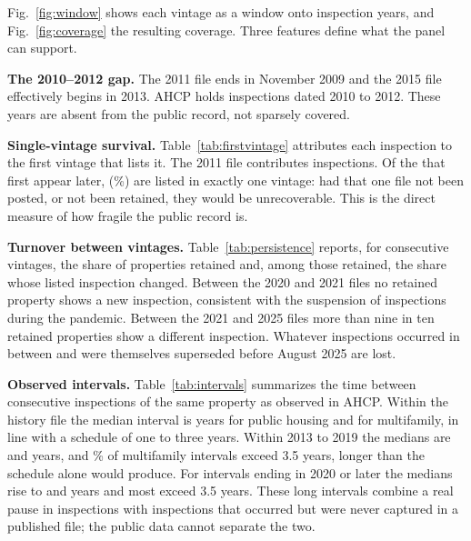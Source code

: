 \documentclass[10pt,twocolumn,letterpaper]{article}
\newcommand{\runhead}[1]{\par\vspace{0.35ex}\noindent\textbf{#1}\hspace{0.35em}}
\begin{document}
Fig.~\ref{fig:window} shows each vintage as a window onto inspection years, and Fig.~\ref{fig:coverage} the resulting coverage. Three features define what the panel can support.

\runhead{The 2010--2012 gap.} The 2011 file ends in November 2009 and the 2015 file effectively begins in 2013. AHCP holds \SInspectionsTwentytenTwentytwelve{} inspections dated 2010 to 2012. These years are absent from the public record, not sparsely covered.

\runhead{Single-vintage survival.} Table~\ref{tab:firstvintage} attributes each inspection to the first vintage that lists it. The 2011 file contributes \inspLegacy{} inspections. Of the \inspPostLegacy{} that first appear later, \inspPostOneVintage{} (\pctPostOneVintage\%) are listed in exactly one vintage: had that one file not been posted, or not been retained, they would be unrecoverable. This is the direct measure of how fragile the public record is.

\begin{table}[t]
\caption{Unique inspections by the first vintage that lists them}\label{tab:firstvintage}
\centering\footnotesize

\end{table}

\runhead{Turnover between vintages.} Table~\ref{tab:persistence} reports, for consecutive vintages, the share of properties retained and, among those retained, the share whose listed inspection changed. Between the 2020 and 2021 files no retained property shows a new inspection, consistent with the suspension of inspections during the pandemic. Between the 2021 and 2025 files more than nine in ten retained properties show a different inspection. Whatever inspections occurred in between and were themselves superseded before August 2025 are lost.

\begin{table}[t]
\caption{Turnover between consecutive vintages. Retained: share of the earlier vintage's properties listed in the later one. New insp.: among retained properties, share whose listed inspection differs.}\label{tab:persistence}
\centering\footnotesize
\resizebox{\columnwidth}{!}{}
\end{table}

\runhead{Observed intervals.} Table~\ref{tab:intervals} summarizes the time between consecutive inspections of the same property as observed in AHCP. Within the history file the median interval is \ivMedPHA{} years for public housing and \ivMedMFA{} for multifamily, in line with a schedule of one to three years. Within 2013 to 2019 the medians are \ivMedPHB{} and \ivMedMFB{} years, and \ivLongMFB\% of multifamily intervals exceed 3.5 years, longer than the schedule alone would produce. For intervals ending in 2020 or later the medians rise to \ivMedPHC{} and \ivMedMFC{} years and most exceed 3.5 years. These long intervals combine a real pause in inspections with inspections that occurred but were never captured in a published file; the public data cannot separate the two.
\end{document}
